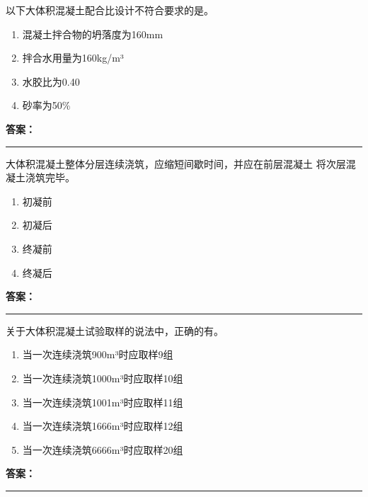 \documentclass[UTF8,fontset=fandol,11pt]{ctexart}
\newcommand{\answerline}{\textcolor{answerred}{\rule{2.4cm}{0.7pt}}}
\begin{document}
\vspace{0.2em}

\begin{quizbox}[title={第 86 题}]
以下大体积混凝土配合比设计不符合要求的是。\\
\begin{enumerate}[label=\Alph*.]
\item 混凝土拌合物的坍落度为160mm
\item 拌合水用量为160kg/m³
\item 水胶比为0.40
\item 砂率为50\%
\end{enumerate}
\textbf{\textcolor{answerred}{答案：}} \answerline
\end{quizbox}

\vspace{0.2em}

\begin{quizbox}[title={第 87 题}]
大体积混凝土整体分层连续浇筑，应缩短间歇时间，并应在前层混凝土 将次层混凝土浇筑完毕。\\
\begin{enumerate}[label=\Alph*.]
\item 初凝前
\item 初凝后
\item 终凝前
\item 终凝后
\end{enumerate}
\textbf{\textcolor{answerred}{答案：}} \answerline
\end{quizbox}

\vspace{0.2em}

\begin{quizbox}[title={第 88 题}]
关于大体积混凝土试验取样的说法中，正确的有。\\
\begin{enumerate}[label=\Alph*.]
\item 当一次连续浇筑900m³时应取样9组
\item 当一次连续浇筑1000m³时应取样10组
\item 当一次连续浇筑1001m³时应取样11组
\item 当一次连续浇筑1666m³时应取样12组
\item 当一次连续浇筑6666m³时应取样20组
\end{enumerate}
\textbf{\textcolor{answerred}{答案：}} \answerline
\end{quizbox}

\vspace{0.2em}
\end{document}
